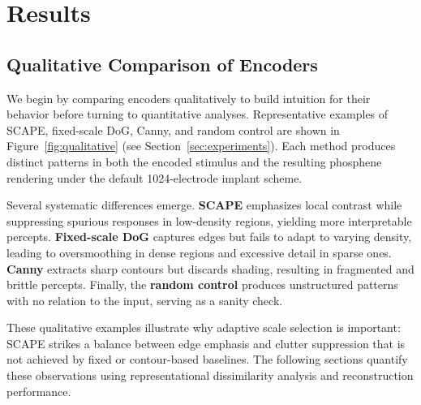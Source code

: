 \section{Results}
\label{sec:results}
\subsection{Qualitative Comparison of Encoders}
\label{sec:qualitative}

We begin by comparing encoders qualitatively to build intuition for their behavior before turning to quantitative analyses. 
Representative examples of SCAPE, fixed-scale DoG, Canny, and random control are shown in Figure~\ref{fig:qualitative} (see Section~\ref{sec:experiments}). 
Each method produces distinct patterns in both the encoded stimulus and the resulting phosphene rendering under the default 1024-electrode implant scheme.

Several systematic differences emerge. 
\textbf{SCAPE} emphasizes local contrast while suppressing spurious responses in low-density regions, yielding more interpretable percepts. 
\textbf{Fixed-scale DoG} captures edges but fails to adapt to varying density, leading to oversmoothing in dense regions and excessive detail in sparse ones. 
\textbf{Canny} extracts sharp contours but discards shading, resulting in fragmented and brittle percepts. 
Finally, the \textbf{random control} produces unstructured patterns with no relation to the input, serving as a sanity check. 

These qualitative examples illustrate why adaptive scale selection is important: SCAPE strikes a balance between edge emphasis and clutter suppression that is not achieved by fixed or contour-based baselines. The following sections quantify these observations using representational dissimilarity analysis and reconstruction performance.

